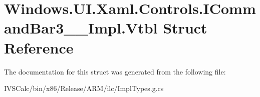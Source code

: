 \hypertarget{struct_windows_1_1_u_i_1_1_xaml_1_1_controls_1_1_i_command_bar3_____impl_1_1_vtbl}{}\section{Windows.\+U\+I.\+Xaml.\+Controls.\+I\+Command\+Bar3\+\_\+\+\_\+\+Impl.\+Vtbl Struct Reference}
\label{struct_windows_1_1_u_i_1_1_xaml_1_1_controls_1_1_i_command_bar3_____impl_1_1_vtbl}


The documentation for this struct was generated from the following file\+:\begin{DoxyCompactItemize}
\item 
I\+V\+S\+Calc/bin/x86/\+Release/\+A\+R\+M/ilc/Impl\+Types.\+g.\+cs\end{DoxyCompactItemize}
